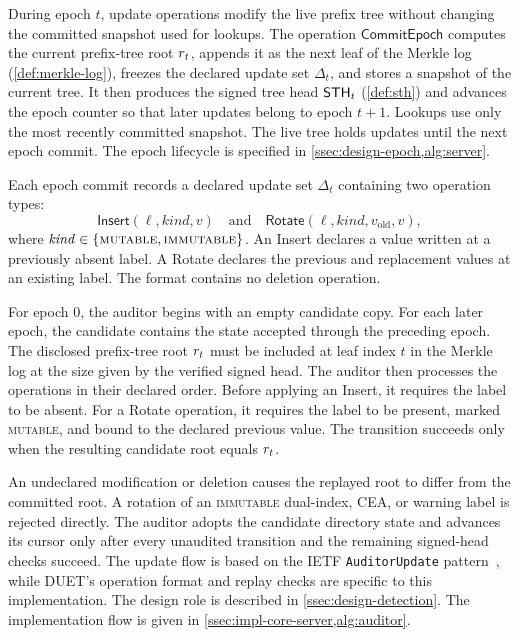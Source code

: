 \begin{definition}[Epoch]\label{def:epoch}
During epoch $t$, update operations modify the live prefix tree without changing the committed
snapshot used for lookups. The operation $\textsf{CommitEpoch}$ computes the current prefix-tree
root $r_{t}$, appends it as the next leaf of the Merkle log
(\cref{def:merkle-log}), freezes the declared update set $\Delta_t$, and stores a snapshot of the
current tree. It then produces the signed tree head $\mathsf{STH}_t$ (\cref{def:sth}) and advances the epoch
counter so that later updates belong to epoch $t+1$. Lookups use only the most recently committed
snapshot. The live tree holds updates until the next epoch commit. The epoch lifecycle is specified
in \cref{ssec:design-epoch,alg:server}.
\end{definition}

\begin{definition}\label{def:epoch-delta}
Each epoch commit records a declared update set $\Delta_t$ containing two operation types:
\[
\textsf{Insert}(\ell,\mathit{kind},v)
\quad\text{and}\quad
\textsf{Rotate}(\ell,\mathit{kind},v_{\mathrm{old}},v),
\]
where $\mathit{kind}\in\{\textsc{mutable},\textsc{immutable}\}$. An
\textsf{Insert} declares a value written at a previously absent label. A \textsf{Rotate} declares
the previous and replacement values at an existing label. The format contains no deletion
operation.

For epoch $0$, the auditor begins with an empty candidate copy. For each later epoch, the
candidate contains the state accepted through the preceding epoch. The disclosed prefix-tree root
$r_{t}$ must be included at leaf index $t$ in the Merkle log at the size given by the
verified signed head. The auditor then processes the operations in their declared order. Before
applying an \textsf{Insert}, it requires the label to be absent. For a \textsf{Rotate}
operation, it requires the label to be present, marked \textsc{mutable}, and bound to the declared
previous value. The transition succeeds only when the resulting candidate root equals
$r_{t}$.

An undeclared modification or deletion causes the replayed root to differ from the committed root.
A rotation of an \textsc{immutable} dual-index, CEA, or warning label is rejected directly. The
auditor adopts the candidate directory state and advances its cursor only after every unaudited transition
and the remaining signed-head checks succeed. The update flow is based on the IETF
\texttt{AuditorUpdate} pattern~\cite[Section~15.2]{ietf-keytrans-protocol}, while DUET's operation
format and replay checks are specific to this implementation. The design role is described in
\cref{ssec:design-detection}. The implementation flow is given in
\cref{ssec:impl-core-server,alg:auditor}.
\end{definition}

